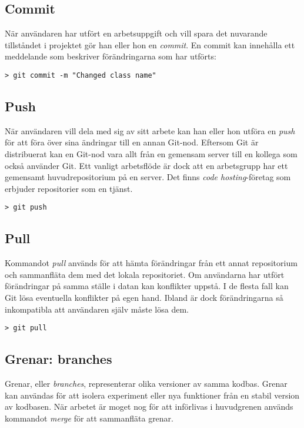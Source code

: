 \subsection{Commit}
När användaren har utfört en arbetsuppgift och vill spara det nuvarande tillståndet i projektet gör han eller hon en \emph{commit}. En commit kan innehålla ett meddelande som beskriver förändringarna som har utförts:

\begin{Verbatim}
> git commit -m "Changed class name"
\end{Verbatim}

\subsection{Push}
När användaren vill dela med sig av sitt arbete kan han eller hon utföra en \emph{push} för att föra över sina ändringar till en annan Git-nod. Eftersom Git är distribuerat kan en Git-nod vara allt från en gemensam server till en kollega som också använder Git. Ett vanligt arbetsflöde är dock att en arbetsgrupp har ett gemensamt huvudrepositorium på en server. Det finns \emph{code hosting}-företag som erbjuder repositorier som en tjänst.
\begin{Verbatim}
> git push
\end{Verbatim}

\subsection{Pull}
Kommandot \emph{pull} används för att hämta förändringar från ett annat repositorium och sammanfläta dem med det lokala repositoriet. Om användarna har utfört förändringar på samma ställe i datan kan konflikter uppstå. I de flesta fall kan Git lösa eventuella konflikter på egen hand. Ibland är dock förändringarna så inkompatibla att användaren själv måste lösa dem.

\begin{Verbatim}
> git pull
\end{Verbatim}

\subsection{Grenar: branches}
Grenar, eller \emph{branches}, representerar olika versioner av samma kodbas. Grenar kan användas för att isolera experiment eller nya funktioner från en stabil version av kodbasen. När arbetet är moget nog för att införlivas i huvudgrenen används kommandot \emph{merge} för att sammanfläta grenar.


